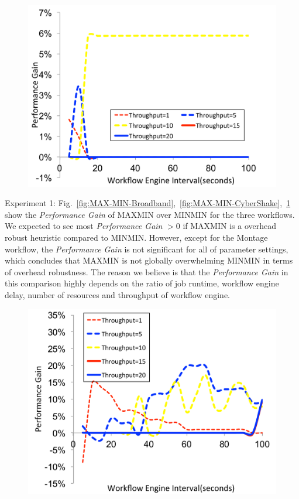 \begin{figure}[!htb]
\centering
 \includegraphics[width=0.9\linewidth]{figure/MAX-MIN-Montage.pdf}
  \label{fig:MAX-MIN-Montage}
  \vspace{-10pt}
\end{figure}


Experiment 1: Fig.~\ref{fig:MAX-MIN-Broadband},~\ref{fig:MAX-MIN-CyberShake},~\ref{fig:MAX-MIN-Montage} show the  \emph{Performance Gain} of MAXMIN over MINMIN for the three workflows. We expected to see most  \emph{Performance Gain} $>0$ if MAXMIN is a overhead robust heuristic compared to MINMIN. However, except for the Montage workflow, the \emph{Performance Gain} is not significant for all of parameter settings, which concludes that MAXMIN is not globally overwhelming MINMIN in terms of overhead robustness. The reason we believe is that the  \emph{Performance Gain} in this comparison highly depends on the ratio of job runtime, workflow engine delay, number of resources and throughput of workflow engine. 

\begin{figure}[!htb]
\centering
 \includegraphics[width=0.9\linewidth]{figure/DFS-BFS-Broadband.pdf}
  \label{fig:DFS-BFS-Broadband}
  \vspace{-10pt}
\end{figure}

